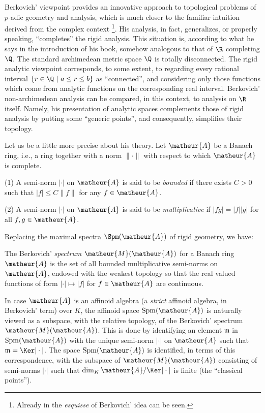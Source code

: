 Berkovich' viewpoint provides an innovative approach to topological
problems of $p$-adic geometry and analysis, which is much closer to the
familiar intuition derived from the complex context
\cite{staagonf}\footnote{Already in \cite{coas} the {\it esquisse} of
Berkovich' idea can be seen.}.  His analysis, in fact, generalizes, or
properly speaking, ``completes'' the rigid analysis.  This situation is,
according to what he says in the introduction of his book, somehow
analogous to that of $\R$ completing $\Q$.  The standard archimedean
metric space $\Q$ is totally disconnected.  The rigid analytic viewpoint
corresponds, to some extent, to regarding every rational interval
$\{r\in\Q\ |\ a\leq r\leq b\}$ as ``connected'', and considering only those
functions which come from analytic functions on the corresponding real
interval.  Berkovich' non-archimedean analysis can be compared, in this
context, to analysis on $\R$ itself. Namely, his presentation of
analytic spaces complements those of rigid analysis by putting some
``generic points'', and consequently, simplifies their topology.

Let us be a little more precise about his theory.
Let $\matheur{A}$ be a Banach ring, i.e., a ring together with a norm 
$\|\cdot\|$ with respect to which $\matheur{A}$ is complete.

\begin{appdfn}\label{dfn-seminorm}

(1) A semi-norm $|\cdot |$ on $\matheur{A}$ is said to be {\it bounded} 
if there exists $C>0$ such that $|f|\leq C\|f\|$ for any $f\in\matheur{A}$.

(2) A semi-norm $|\cdot |$ on $\matheur{A}$ is said to be 
{\it multiplicative} if $|fg|=|f||g|$ for all $f,g\in\matheur{A}$.
\end{appdfn}

Replacing the maximal spectra $\Spm(\matheur{A})$ of rigid geometry, we have:
\begin{appdfn}\label{dfn-Berkovich-spectrum}
The Berkovich' {\it spectrum} $\matheur{M}(\matheur{A})$ for a Banach ring
$\matheur{A}$ is the set of all bounded multiplicative semi-norms on
$\matheur{A}$, endowed with the weakest topology so that the real
valued functions of form $|\cdot |\mapsto |f|$ for $f\in\matheur{A}$
are continuous.
\end{appdfn}

In case $\matheur{A}$ is an affinoid algebra (a {\it strict} affinoid
algebra, in Berkovich' term) over $K$, the affinoid space 
$\mathrm{Spm}(\matheur{A})$ is naturally viewed as a subspace, with 
the relative topology, of the Berkovich' spectrum $\matheur{M}(\matheur{A})$.
This is done by identifying an element $\mathfrak{m}$ in
$\mathrm{Spm}(\matheur{A})$ with the unique semi-norm $|\cdot |$ on 
$\matheur{A}$ such that $\mathfrak{m}=\Ker |\cdot |$.
The space $\mathrm{Spm}(\matheur{A})$ is identified, in terms of this 
correspondence, with the subspace of $\matheur{M}(\matheur{A})$ consisting of
semi-norms $|\cdot |$ such that $\dim_K\matheur{A}/\Ker |\cdot |$ is 
finite (the ``classical points'').

